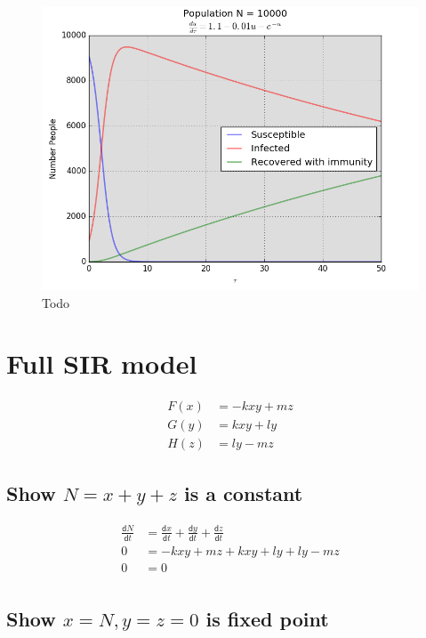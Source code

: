 \documentclass[a4paper]{article}
\begin{document}
\begin{figure}[H]
\centering
\includegraphics[width=1\textwidth]{q7_6.png}
\caption{\label{fig:data}Todo}
\end{figure}


\section{Full SIR model}

\begin{equation}
\begin{aligned}
F(x) &= -kxy + mz \\
G(y) &= kxy + ly \\
H(z) &= ly - mz 
\end{aligned}
\end{equation}

\subsection{Show $N = x + y + z$ is a constant}

\begin{align*}
\frac{\mathsf{d}N}{\mathsf{d}t} &= \frac{\mathsf{d}x}{\mathsf{d}t} + \frac{\mathsf{d}y}{\mathsf{d}t} + \frac{\mathsf{d}z}{\mathsf{d}t} \\
0 &= -kxy + mz + kxy + ly + ly - mz \\
0 &= 0  \\
\end{align*}

\subsection{Show $x = N, y = z = 0$ is  fixed point}
\end{document}
